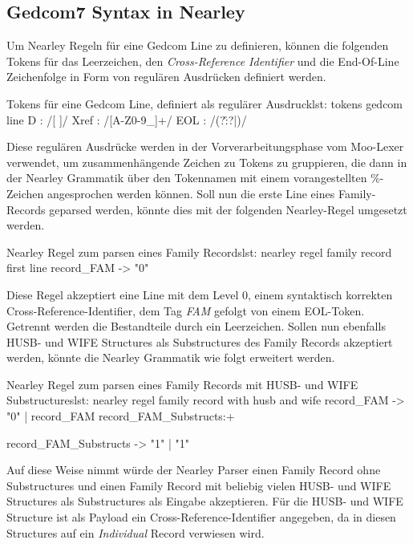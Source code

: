 \subsection{Gedcom7 Syntax in Nearley}
\label{subsec: Implementierung - Gedcom Grammatik - Gedcom7 Syntax in Nearley}
Um Nearley Regeln für eine Gedcom Line zu definieren, können die folgenden Tokens für das Leerzeichen, den \textit{Cross-Reference Identifier} und die End-Of-Line Zeichenfolge in Form von regulären Ausdrücken definiert werden.
\vspace{1em}
\begin{javascript}{Tokens für eine Gedcom Line, definiert als regulärer Ausdruck}{lst: tokens gedcom line}
	D    : /[ ]/
	Xref : /\@[A-Z0-9\_]+\@/	
	EOL  : /(?:\r\n?|\n)/
\end{javascript}
\newpage
{
\noindent
Diese regulären Ausdrücke werden in der Vorverarbeitungsphase vom Moo-Lexer verwendet, um zusammenhängende Zeichen zu Tokens zu gruppieren, die dann in der Nearley Grammatik über den Tokennamen mit einem vorangestellten \%-Zeichen angesprochen werden können. Soll nun die erste Line eines Family-Records geparsed werden, könnte dies mit der folgenden Nearley-Regel umgesetzt werden.
}
\vspace{0em}
\begin{javascript}{Nearley Regel zum parsen eines Family Records}{lst: nearley regel family record first line}
	record_FAM -> "0"  %
\end{javascript}
\vspace{1em}
Diese Regel akzeptiert eine Line mit dem Level 0, einem syntaktisch korrekten Cross-Reference-Identifier, dem Tag \textit{FAM} gefolgt von einem EOL-Token. Getrennt werden die Bestandteile durch ein Leerzeichen. Sollen nun ebenfalls HUSB- und WIFE Structures als Substructures des Family Records akzeptiert werden, könnte die Nearley Grammatik wie folgt erweitert werden.
\vspace{1em}
\begin{javascript}{Nearley Regel zum parsen eines Family Records mit HUSB- und WIFE Substructures}{lst: nearley regel family record with husb and wife}
	record_FAM
		-> "0"  %
		|  record_FAM  record_FAM_Substructs:+
	
	record_FAM_Substructs 
		-> "1"  %
		|  "1"  %
\end{javascript}
\vspace{1em}
Auf diese Weise nimmt würde der Nearley Parser einen Family Record ohne Substructures und einen Family Record mit beliebig vielen HUSB- und WIFE Structures als Substructures als Eingabe akzeptieren. Für die HUSB- und WIFE Structure ist als Payload ein Cross-Reference-Identifier angegeben, da in diesen Structures auf ein \textit{Individual} Record verwiesen wird.

